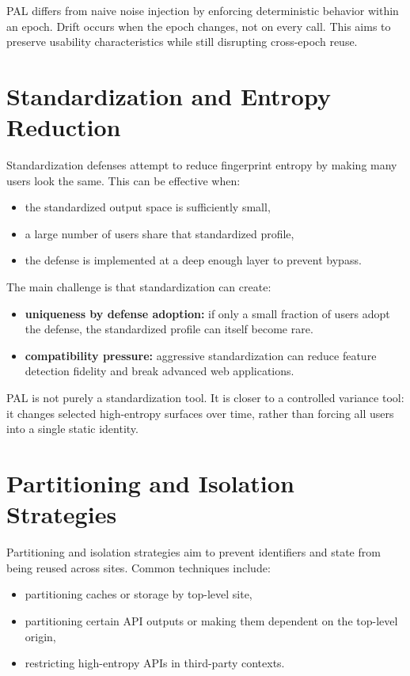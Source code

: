 \documentclass[11pt]{report}
\begin{document}
PAL differs from naive noise injection by enforcing deterministic behavior within an epoch. Drift occurs when the epoch changes, not on every call. This aims to preserve usability characteristics while still disrupting cross-epoch reuse.

\section{Standardization and Entropy Reduction}

Standardization defenses attempt to reduce fingerprint entropy by making many users look the same. This can be effective when:

\begin{itemize}
    \item the standardized output space is sufficiently small,
    \item a large number of users share that standardized profile,
    \item the defense is implemented at a deep enough layer to prevent bypass.
\end{itemize}

The main challenge is that standardization can create:

\begin{itemize}
    \item \textbf{uniqueness by defense adoption:} if only a small fraction of users adopt the defense, the standardized profile can itself become rare.
    \item \textbf{compatibility pressure:} aggressive standardization can reduce feature detection fidelity and break advanced web applications.
\end{itemize}

PAL is not purely a standardization tool. It is closer to a controlled variance tool: it changes selected high-entropy surfaces over time, rather than forcing all users into a single static identity.

\section{Partitioning and Isolation Strategies}

Partitioning and isolation strategies aim to prevent identifiers and state from being reused across sites. Common techniques include:

\begin{itemize}
    \item partitioning caches or storage by top-level site,
    \item partitioning certain API outputs or making them dependent on the top-level origin,
    \item restricting high-entropy APIs in third-party contexts.
\end{itemize}
\end{document}
